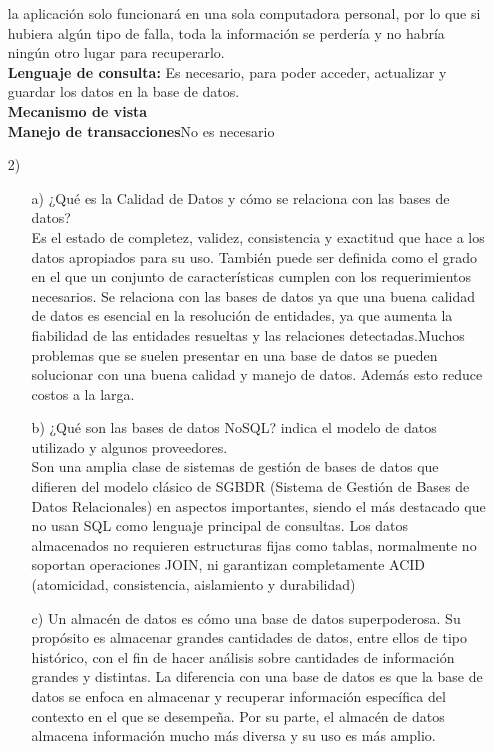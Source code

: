 \documentclass[a4paper, 12pt]{report}
\begin{document}
\begin{enumerate}
{\begin{enumerate}
{    la aplicación solo funcionará en una sola computadora personal,
    por lo que si hubiera algún tipo de falla, toda la información
    se perdería y no habría ningún otro lugar para recuperarlo.\\
    \textbf{Lenguaje de consulta:} Es necesario, para poder acceder,
    actualizar y guardar los datos en la base de datos.\\
    \textbf{Mecanismo de vista}\\
    \textbf{Manejo de transacciones}No es necesario\\}
\end{enumerate}
}
\item[2)]{
\begin{enumerate}
    \item[a)]{¿Qué es la Calidad de Datos y cómo se relaciona con las
    bases de datos?\\
    Es  el estado de completez, validez, consistencia y exactitud
    que hace a los datos apropiados para su uso. También puede ser
    definida como el grado en el que un conjunto de características
    cumplen con los requerimientos necesarios.
    Se relaciona con las bases de datos ya que una buena calidad de
    datos es esencial en la resolución de entidades, ya que aumenta la
    fiabilidad de las entidades resueltas y las relaciones
    detectadas.Muchos problemas que se suelen presentar en una base
    de datos se pueden solucionar con una buena calidad y manejo
    de datos. Además esto reduce costos a la larga.
}
    \item[b)]{¿Qué son las bases de datos NoSQL? indica el modelo de datos utilizado y algunos proveedores. }\\
    Son una amplia clase de sistemas de gestión de bases de datos que difieren del modelo clásico de SGBDR (Sistema de Gestión de Bases de Datos Relacionales) en aspectos importantes, siendo el más destacado que no usan SQL como lenguaje principal de consultas. Los datos almacenados no requieren estructuras fijas como tablas, normalmente no soportan operaciones JOIN, ni garantizan completamente ACID (atomicidad, consistencia, aislamiento y durabilidad)
    \item[c)]{Un almacén de datos es cómo una base de datos superpoderosa. Su
        propósito es almacenar grandes cantidades de datos, entre ellos de tipo
        histórico, con el fin de hacer análisis sobre cantidades de información
        grandes y distintas. La diferencia con una base de datos es que la base
        de datos se enfoca en almacenar y recuperar información específica del
        contexto en el que se desempeña. Por su parte, el almacén de datos almacena
        información mucho más diversa y su uso es más amplio.\cite{DWvDB}
    }
\end{enumerate}
}
\end{enumerate}
\end{document}
